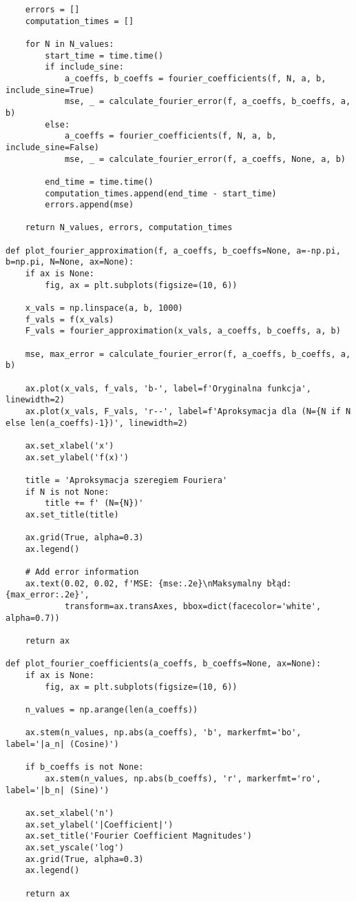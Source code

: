 \documentclass{article}
\begin{document}
\begin{verbatim}
    errors = []
    computation_times = []
    
    for N in N_values:
        start_time = time.time()
        if include_sine:
            a_coeffs, b_coeffs = fourier_coefficients(f, N, a, b, include_sine=True)
            mse, _ = calculate_fourier_error(f, a_coeffs, b_coeffs, a, b)
        else:
            a_coeffs = fourier_coefficients(f, N, a, b, include_sine=False)
            mse, _ = calculate_fourier_error(f, a_coeffs, None, a, b)
        
        end_time = time.time()
        computation_times.append(end_time - start_time)
        errors.append(mse)
    
    return N_values, errors, computation_times

def plot_fourier_approximation(f, a_coeffs, b_coeffs=None, a=-np.pi, b=np.pi, N=None, ax=None):
    if ax is None:
        fig, ax = plt.subplots(figsize=(10, 6))
    
    x_vals = np.linspace(a, b, 1000)
    f_vals = f(x_vals)
    F_vals = fourier_approximation(x_vals, a_coeffs, b_coeffs, a, b)
    
    mse, max_error = calculate_fourier_error(f, a_coeffs, b_coeffs, a, b)
    
    ax.plot(x_vals, f_vals, 'b-', label=f'Oryginalna funkcja', linewidth=2)
    ax.plot(x_vals, F_vals, 'r--', label=f'Aproksymacja dla (N={N if N else len(a_coeffs)-1})', linewidth=2)
    
    ax.set_xlabel('x')
    ax.set_ylabel('f(x)')
    
    title = 'Aproksymacja szeregiem Fouriera'
    if N is not None:
        title += f' (N={N})'
    ax.set_title(title)
    
    ax.grid(True, alpha=0.3)
    ax.legend()
    
    # Add error information
    ax.text(0.02, 0.02, f'MSE: {mse:.2e}\nMaksymalny błąd: {max_error:.2e}', 
            transform=ax.transAxes, bbox=dict(facecolor='white', alpha=0.7))
    
    return ax

def plot_fourier_coefficients(a_coeffs, b_coeffs=None, ax=None):
    if ax is None:
        fig, ax = plt.subplots(figsize=(10, 6))
    
    n_values = np.arange(len(a_coeffs))
    
    ax.stem(n_values, np.abs(a_coeffs), 'b', markerfmt='bo', label='|a_n| (Cosine)')
    
    if b_coeffs is not None:
        ax.stem(n_values, np.abs(b_coeffs), 'r', markerfmt='ro', label='|b_n| (Sine)')
    
    ax.set_xlabel('n')
    ax.set_ylabel('|Coefficient|')
    ax.set_title('Fourier Coefficient Magnitudes')
    ax.set_yscale('log')
    ax.grid(True, alpha=0.3)
    ax.legend()
    
    return ax
\end{verbatim}



\end{document}
